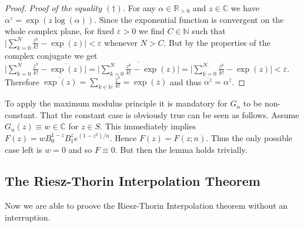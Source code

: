 \begin{proof}
					\emph{Proof of the equality $(\dagger)$.} For any $\alpha \in \mathbb{R}_{>0}$ and $z \in \mathbb{C}$ we have $\alpha^z = \exp(z \log(\alpha))$. Since the exponential function is convergent on the whole complex plane, for fixed $\varepsilon > 0$ we find $C \in \mathbb{N}$ such that $\vert \sum_{k = 0}^N \frac{z^k}{k!} - \exp(z) \vert < \varepsilon$ whenever $N > C$. But by the properties of the complex conjugate we get $\vert \sum_{k = 0}^N \frac{\overline{z}^k}{k!} - \overline{\exp(z)} \vert = \vert \overline{\sum_{k = 0}^N \frac{z^k}{k!} - \exp(z)} \vert =\vert \sum_{k = 0}^N \frac{z^k}{k!} - \exp(z) \vert < \varepsilon $. Therefore $\overline{\exp(z)} = \sum_{k \in \mathbb{N}} \frac{\overline{z}^k}{k!} = \exp(\overline{z})$ and thus $\overline{\alpha^z} = \alpha^{\overline{z}}$.
		\end{proof}


		\begin{remark}
			To apply the maximum modulus principle it is mandatory for $G_n$ to be non-constant. That the constant case is obviously true can be seen as follows. Assume $G_n(z) \equiv w \in \mathbb{C}$ for $z \in S$. This immediately implies $F(z) = w B_0^{1 - z}B_1^z e^{(1 - z^2)/n}$. Hence $F(z) = F(z;n)$. Thus the only possible case left is $w = 0$ and so $F \equiv 0$. But then the lemma holds trivially.
		\end{remark}

		\subsection{The Riesz-Thorin Interpolation Theorem}
		Now we are able to proove the Riesz-Thorin Interpolation theorem without an interruption.

\vspace{2mm}

